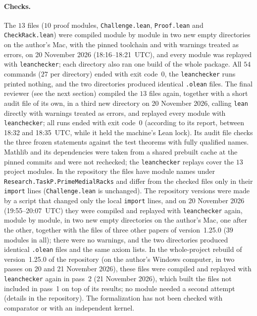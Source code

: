 \documentclass[11pt]{article}
\theoremstyle{definition}
\theoremstyle{remark}
\newcommand{\repoversion}{1.25.0}
\begin{document}
{\paragraph{Checks.}
The $13$ files ($10$ proof modules, \texttt{Challenge.lean},
\texttt{Proof.lean} and \texttt{CheckRack.lean}) were compiled module by
module in two new empty directories on the author's Mac, with the pinned
toolchain and with warnings treated as errors, on 20 November 2026
(18:16--18:21~UTC), and every module was replayed with \texttt{leanchecker};
each directory also ran one build of the whole package. All $54$ commands
($27$ per directory) ended with exit code~$0$, the \texttt{leanchecker} runs
printed nothing, and the two directories produced identical \texttt{.olean}
files. The final reviewer (see the next section) compiled the $13$ files again,
together with a short audit file of its own, in a third new directory on
20 November 2026, calling \texttt{lean} directly with warnings treated as
errors, and replayed every module with \texttt{leanchecker}; all runs ended
with exit code~$0$ (according to its report, between 18:32 and 18:35~UTC, while
it held the machine's Lean lock). Its audit file checks the three frozen
statements against the test theorems with fully qualified names. Mathlib and
its dependencies were taken from a shared prebuilt cache at the pinned commits
and were not rechecked; the \texttt{leanchecker} replays cover the $13$ project
modules. In the repository the files have module names under
\texttt{Research.TaskP.PrimeMedialRacks} and differ from the checked files only
in their \texttt{import} lines (\texttt{Challenge.lean} is unchanged).
The repository versions were made by a script that changed only the local \texttt{import} lines, and on 20 November 2026 (19:55--20:07~UTC) they were compiled and replayed with \texttt{leanchecker} again, module by module, in two new empty directories on the author's Mac, one after the other, together with the files of three other papers of version~\repoversion{} ($39$ modules in all); there were no warnings, and the two directories produced identical \texttt{.olean} files and the same axiom lists. In the whole-project rebuild of version~\repoversion{} of the repository (on the author's Windows computer, in two passes on 20 and 21 November 2026), these files were compiled and replayed with \texttt{leanchecker} again in pass~2 (21 November 2026), which built the files not included in pass~1 on top of its results; no module needed a second attempt (details in the repository). The formalization has not been checked with
comparator or with an independent kernel.

\par}
\end{document}
